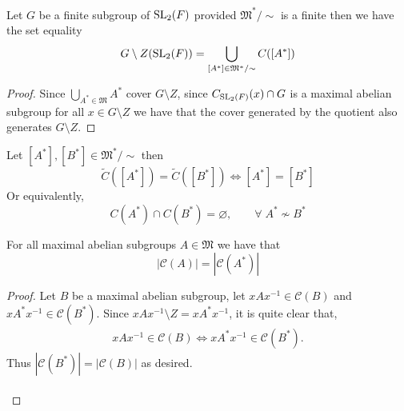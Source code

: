 \begin{footnotesize}
\begin{theorem}
\label{union_lift_noncenter_C_eq_G_diff_center}
  Let $G$ be a finite subgroup of $\operatorname{SL}_2(F)$ provided $\mathfrak{M}^* / \sim$ is a finite then we have the set equality
  \[
   G \setminus Z(\operatorname{SL}_2(F)) = \bigcup_{[A^*] \in \mathfrak{M}^* / \sim} C([A^*])
  \]
\end{theorem}
\begin{proof}
  Since $\bigcup_{A^* \in \mathfrak{M}} A^*$ cover $G \setminus Z$, since $C_{\operatorname{SL}_2(F)}(x) \cap G$ is a maximal abelian subgroup for all $x \in G \setminus Z$
  we have that the cover generated by the quotient also generates $G \setminus Z$.
\end{proof}


\begin{theorem}
  \label{disjoint_of_ne_lift_noncenter_MaximalAbelianSubgroupsOf}
  \leanok
  Let $[A^*], [B^*] \in \mathfrak{M}^* / \sim$ then
  \[
  \tilde{C}([A^*]) = \tilde{C}([B^*]) \iff [A^*] = [B^*]
  \]
  Or equivalently,
  \[ 
  C(A^*) \cap C(B^*) = \varnothing, \qquad \forall \;  A^* \not\sim B^* 
  \]
\end{theorem}



\begin{theorem}
  \label{card_noncenter_ConjClassOfSet_eq_card_ConjClassOfSet}
  For all maximal abelian subgroups $A \in \mathfrak{M}$ we have that 
  \[
  |\mathcal{C}(A)| = |\mathcal{C}(A^*)|
  \]
\end{theorem}
\begin{proof}
  Let $B$ be a maximal abelian subgroup, let $x A x^{-1} \in \mathcal{C}(B)$ and $x A^* x^{-1} \in \mathcal{C}(B^*)$. Since $x A x^{-1} \! \setminus \! Z = x A^* x^{-1}$, it is quite clear that,
  \begin{align*} x A x^{-1} \in \mathcal{C}(B) \iff x A^* x^{-1} \in \mathcal{C}(B^*).
  \end{align*}
  Thus $|\mathcal{C}(B^*)| = |\mathcal{C}(B)|$ as desired. \\
  \\
\end{proof}



\end{footnotesize}
